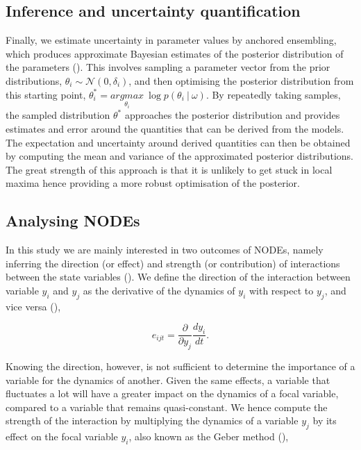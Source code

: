 \documentclass[11pt, oneside]{article}
\begin{document}
\subsection{Inference and uncertainty quantification}

Finally, we estimate uncertainty in parameter values by anchored ensembling, which produces approximate Bayesian estimates of the posterior distribution of the parameters (\cite{Pearce2018}).
This involves sampling a parameter vector from the prior distributions, $\theta_{i} \sim \mathcal{N}(0,\delta_{i})$, and then optimising the posterior distribution from this starting point, $\theta^*_i = \underset{\theta_i}{argmax}~\log p(\theta_i~|~\omega)$.
By repeatedly taking samples, the sampled distribution $\theta^*$ approaches the posterior distribution and provides estimates and error around the quantities that can be derived from the models.
The expectation and uncertainty around derived quantities can then be obtained by computing the mean and variance of the approximated posterior distributions.
The great strength of this approach is that it is unlikely to get stuck in local maxima hence providing a more robust optimisation of the posterior.

\subsection{Analysing NODEs}

In this study we are mainly interested in two outcomes of NODEs, namely inferring the direction (or effect) and strength (or contribution) of interactions between the state variables (\cite{Bonnaffe2021a}).
We define the direction of the interaction between variable $y_i$ and $y_j$ as the derivative of the dynamics of $y_i$ with respect to $y_j$, and vice versa (\cite{Sugihara2012}), 

\vspace{-0.5cm}
\begin{equation}
    e_{ijt} = \frac{\partial}{\partial y_j} \frac{dy_i}{dt}.
\end{equation}

Knowing the direction, however, is not sufficient to determine the importance of a variable for the dynamics of another. 
Given the same effects, a variable that fluctuates a lot will have a greater impact on the dynamics of a focal variable, compared to a variable that remains quasi-constant.
We hence compute the strength of the interaction by multiplying the dynamics of a variable $y_j$ by its effect on the focal variable $y_i$, also known as the Geber method (\cite{Hairston2005}),
\end{document}
